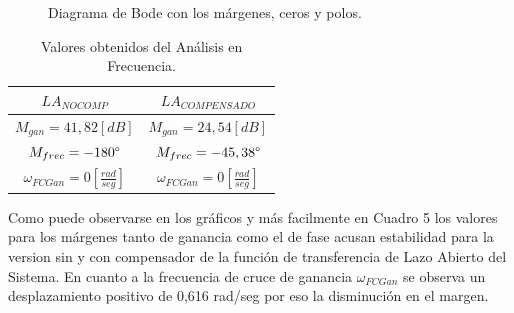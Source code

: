 \documentclass[a4paper,11pt]{article}
\begin{document}
	\begin{figure}[H] %
	\caption{Diagrama de Bode con los márgenes, ceros y polos.}
	\label{fig:Bode_GIMP}
	\end{figure}

\begin{table}[h!]
\centering
\caption{Valores obtenidos del Análisis en Frecuencia.}
\begin{tabular}{|c|c|}
\hline
$LA_{NO COMP}$ & $LA_{COMPENSADO}$\tabularnewline
\hline
\hline 
$M_{gan}=41,82[dB]$ & $M_{gan}=24,54[dB]$\tabularnewline
\hline 
$M_{frec}=-180\degree $ & $M_{frec}=-45,38\degree $\tabularnewline
\hline 
$\omega_{FCGan}=0[\frac{rad}{seg}]$ & $\omega_{FCGan}=0[\frac{rad}{seg}]$\tabularnewline
\hline
\end{tabular}
\end{table}

Como puede observarse en los gráficos y más facilmente en Cuadro 5  los valores para los márgenes tanto de ganancia como el de fase acusan estabilidad para la version sin y con compensador de la función de transferencia de Lazo Abierto del Sistema.
En cuanto a la frecuencia de cruce de ganancia $\omega_{FCGan}$ se observa un desplazamiento positivo de 0,616 rad/seg por eso la disminución en el margen. 
\end{document}
